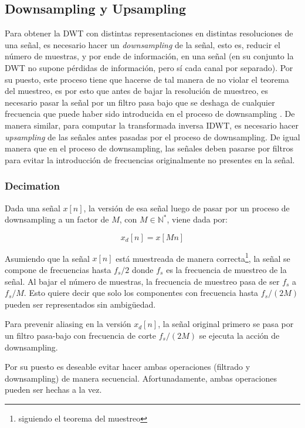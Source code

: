 \documentclass[conference]{IEEEtran}
\begin{document}
\subsection{Downsampling y Upsampling}

Para obtener la DWT con distintas representaciones en distintas resoluciones de una señal, es necesario hacer un \emph{downsampling} de la señal, esto es, reducir el número de muestras, y por ende de información, en una señal (en su conjunto la DWT no supone pérdidas de información, pero sí cada canal por separado). Por su puesto, este proceso tiene que hacerse de tal manera de no violar el teorema del muestreo, es por esto que antes de bajar la resolución de muestreo, es necesario pasar la señal por un filtro pasa bajo que se deshaga de cualquier frecuencia que puede haber sido introducida en el proceso de downsampling    \cite{dwt}. De manera similar, para computar la transformada inversa IDWT, es necesario hacer \emph{upsampling} de las señales antes pasadas por el proceso de downsampling. De igual manera que en el proceso de downsampling, las señales deben pasarse por filtros para evitar la introducción de frecuencias originalmente no presentes en la señal.

\subsubsection{Decimation}

Dada una señal $x[n]$, la versión de esa señal luego de pasar por un proceso de downsampling a un factor de $M$, con $M \in \mathds{N}^*$, viene dada por:

\begin{equation}
  x_d[n] = x[Mn]
\end{equation}

Asumiendo que la señal $x[n]$ está muestreada de manera correcta\footnote{siguiendo el teorema del muestreo}, la señal se compone de frecuencias hasta $f_s/2$ donde $f_s$ es la frecuencia de muestreo de la señal. Al bajar el número de muestras, la frecuencia de muestreo pasa de ser $f_s$ a $f_s/M$. Esto quiere decir que solo los componentes con frecuencia hasta $f_s/(2M)$ pueden ser representados sin ambigüedad.

Para prevenir aliasing en la versión $x_d[n]$, la señal original primero se pasa por un filtro pasa-bajo con frecuencia de corte $f_s/(2M)$ se ejecuta la acción de downsampling.

Por su puesto es deseable evitar hacer ambas operaciones (filtrado y downsampling) de manera secuencial. Afortunadamente, ambas operaciones pueden ser hechas a la vez.
\end{document}
